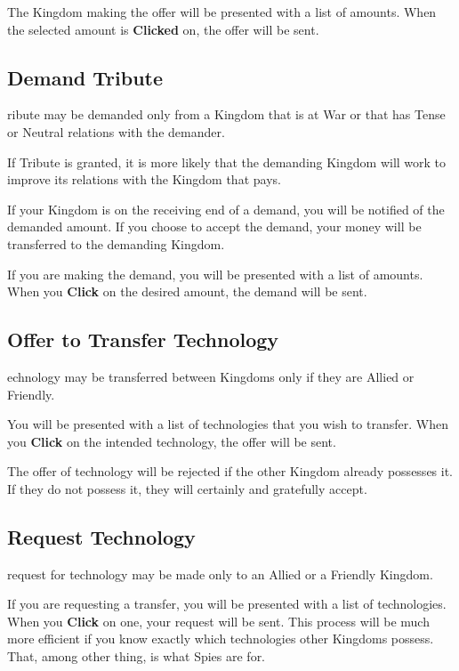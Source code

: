 The Kingdom making the offer will be presented with a list of amounts. When the selected amount is \textbf{Clicked} on, the offer will be sent.

\subsection{Demand Tribute}


ribute may be demanded only from a Kingdom that is at War or that has Tense or Neutral relations with the demander.

If Tribute is granted, it is more likely that the demanding Kingdom will work to improve its relations with the Kingdom that pays.

If your Kingdom is on the receiving end of a demand, you will be notified of the demanded amount. If you choose to accept the demand, your money will be transferred to the demanding Kingdom.

If you are making the demand, you will be presented with a list of amounts. When you \textbf{Click} on the desired amount, the demand will be sent.

\subsection{Offer to Transfer Technology}


echnology may be transferred between Kingdoms only if they are Allied or Friendly.

You will be presented with a list of technologies that you wish to transfer. When you \textbf{Click} on the intended technology, the offer will be sent.

The offer of technology will be rejected if the other Kingdom already possesses it. If they do not possess it, they will certainly and gratefully accept.

\subsection{Request Technology}


 request for technology may be made only to an Allied or a Friendly Kingdom.

If you are requesting a transfer, you will be presented with a list of technologies. When you \textbf{Click} on one, your request will be sent. This process will be much more efficient if you know exactly which technologies other Kingdoms possess. That, among other thing, is what Spies are for.

